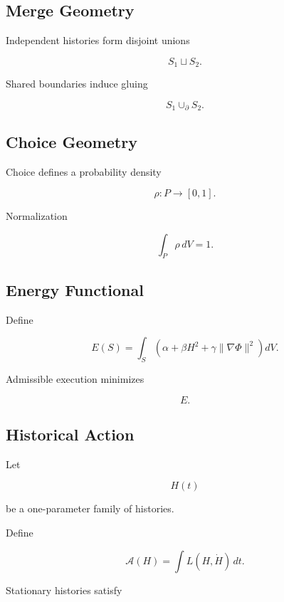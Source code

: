 \documentclass[12pt,oneside]{article}
\theoremstyle{definition}
\theoremstyle{remark}
\begin{document}
\subsection*{Merge Geometry}

Independent histories form disjoint unions

\[
S_1
\sqcup
S_2.
\]

Shared boundaries induce gluing

\[
S_1
\cup_{\partial}
S_2.
\]

\subsection*{Choice Geometry}

Choice defines a probability density

\[
\rho
:
P
\rightarrow
[0,1].
\]

Normalization

\[
\int_P
\rho
\,dV
=
1.
\]

\subsection*{Energy Functional}

Define

\[
E(S)
=
\int_S
\left(
\alpha
+
\beta H^2
+
\gamma
\|\nabla\Phi\|^2
\right)
dV.
\]

Admissible execution minimizes

\[
E.
\]

\subsection*{Historical Action}

Let

\[
H(t)
\]

be a one-parameter family of histories.

Define

\[
\mathcal A(H)
=
\int
L(H,\dot H)
\,dt.
\]

Stationary histories satisfy
\end{document}
